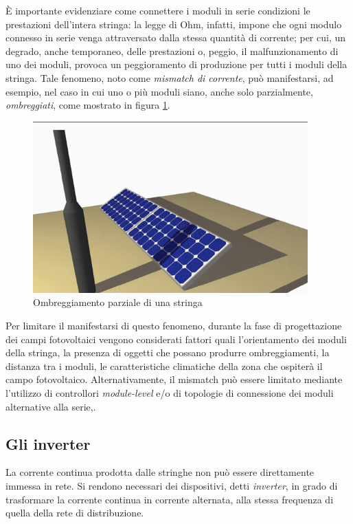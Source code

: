 %
\`E importante evidenziare come connettere i moduli in serie condizioni le 
prestazioni dell'intera stringa: la legge di Ohm, infatti, impone che ogni 
modulo connesso in serie venga attraversato dalla stessa quantit\`a di corrente;
per cui, un degrado, anche temporaneo, delle prestazioni o, peggio, il 
malfunzionamento di uno dei moduli, provoca un peggioramento di produzione 
per tutti i moduli della stringa.
%
Tale fenomeno, noto come \emph{mismatch di corrente}, pu\`o manifestarsi,
ad esempio, nel caso in cui uno o pi\`u moduli siano, anche solo parzialmente, 
\emph{ombreggiati}, come mostrato in figura \ref{ombreggiamento}.
%
\begin{figure}[!h]
\centering
\includegraphics[width=300pt]{img/fv-ombreggiamento.png}
\caption{Ombreggiamento parziale di una stringa}
\label{ombreggiamento}
\end{figure}
%

%
Per limitare il manifestarsi di questo fenomeno, durante la fase di progettazione 
dei campi fotovoltaici vengono considerati fattori quali  l'orientamento 
dei moduli della stringa,  la presenza di oggetti che possano produrre 
ombreggiamenti,  la distanza tra i moduli,  le caratteristiche 
climatiche della zona che ospiter\`a il campo fotovoltaico.
%
Alternativamente, il mismatch pu\`o essere limitato mediante l'utilizzo di 
controllori \emph{module-level} e/o di topologie di connessione dei moduli 
alternative alla serie\cite{roman06},\cite{sung09}.
%

%
\subsection{Gli inverter}
La corrente continua prodotta dalle stringhe non pu\`o essere direttamente
immessa in rete. Si rendono necessari dei dispositivi, detti \emph{inverter}, 
in grado di trasformare la corrente continua in corrente alternata, alla 
stessa frequenza di quella della rete di distribuzione.
%


